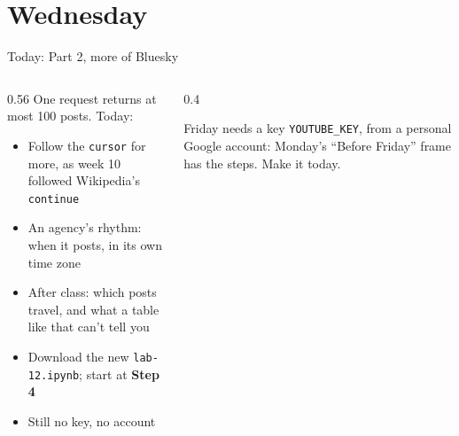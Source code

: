 \documentclass[9pt,aspectratio=169]{beamer}
\begin{document}
\section{Wednesday}

\begin{frame}{Today: Part 2, more of Bluesky}
    \begin{columns}[T]
        \begin{column}{0.56\textwidth}
            One request returns at most 100 posts. Today:
            \begin{itemize}\small
                \item Follow the \texttt{cursor} for more, as week 10 followed Wikipedia's \texttt{continue}
                \item An agency's rhythm: when it posts, in its own time zone
                \item After class: which posts travel, and what a table like that can't tell you
            \end{itemize}

            \medskip
            \begin{itemize}\small
                \item Download the new \texttt{lab-12.ipynb}; start at \textbf{Step 4}
                \item Still no key, no account
            \end{itemize}
        \end{column}
        \begin{column}{0.4\textwidth}
            \begin{alertblock}{Friday needs a key}
                \footnotesize \texttt{YOUTUBE\_KEY}, from a personal Google account: Monday's ``Before Friday'' frame has the steps. Make it today.
            \end{alertblock}
        \end{column}
    \end{columns}
\end{frame}
\end{document}
